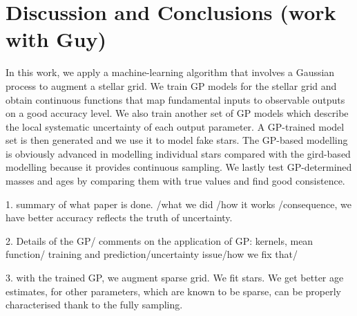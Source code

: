 \section{Discussion and Conclusions (work with Guy)}\label{sec:conclusion}

In this work, we apply a machine-learning algorithm that involves a Gaussian process to augment a stellar grid. We train GP models for the stellar grid and obtain continuous functions that map fundamental inputs to observable outputs on a good accuracy level. We also train another set of GP models which describe the local systematic uncertainty of each output parameter. A GP-trained model set is then generated and we use it to model fake stars. The GP-based modelling is obviously advanced in modelling individual stars compared with the gird-based modelling because it provides continuous sampling. We lastly test GP-determined masses and ages by comparing them with true values and find good consistence. 

1. summary of what paper is done.
/what we did
/how it works
/consequence, we have better accuracy reflects the truth of uncertainty. 


2. Details of the GP/ comments on the application of GP: kernels, mean function/ training and prediction/uncertainty issue/how we fix that/

3. with the trained GP, we augment sparse grid. We fit stars. We get better age estimates, for other parameters, which are known to be sparse, can be properly characterised thank to the fully sampling. 

%
%
%
%

